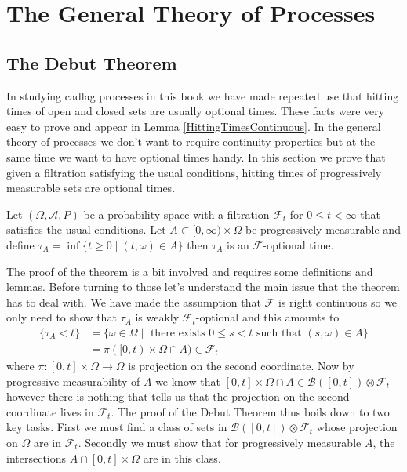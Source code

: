 \chapter{The General Theory of Processes}

\section{The Debut Theorem}

In studying cadlag processes in this book we have made repeated use that hitting times of open and closed sets are usually optional times.  These facts were very easy to prove
and appear in Lemma \ref{HittingTimesContinuous}.   In the general theory of processes we don't want to require continuity properties but at the same time we want to have
optional times handy.  In this section we prove that given a filtration satisfying the usual conditions, hitting times of progressively measurable sets are optional times.  

\begin{thm}\label{DebutTheorem}Let $(\Omega, \mathcal{A}, P)$ be a probability space with a filtration $\mathcal{F}_t$ for $0 \leq t < \infty$ that satisfies the usual conditions.  Let $A \subset [0, \infty) \times \Omega$ be progressively measurable and define $\tau_A = \inf \lbrace t \geq 0 \mid (t, \omega) \in A \rbrace$ then $\tau_A$ is an $\mathcal{F}$-optional time.
\end{thm}

The proof of the theorem is a bit involved and requires some definitions and lemmas.  Before turning to those let's understand the main issue that the theorem has to deal with.  We have made the assumption that $\mathcal{F}$ is right continuous so we only need to show that $\tau_A$ is weakly $\mathcal{F}_t$-optional and this amounts to
\begin{align*}
\lbrace \tau_A < t \rbrace &= \lbrace \omega \in \Omega \mid \text{ there exists } 0 \leq s < t \text{ such that } (s, \omega) \in A \rbrace \\
&=\pi([0,t) \times \Omega \cap A) \in \mathcal{F}_t
\end{align*}
where $\pi : [0,t] \times \Omega \to \Omega$ is projection on the second coordinate.  Now by progressive measurability of $A$ we know that $[0,t] \times \Omega \cap A \in \mathcal{B}([0,t]) \otimes \mathcal{F}_t$ however there is nothing that tells us that the projection on the second coordinate lives in $\mathcal{F}_t$.  The proof of the Debut Theorem thus boils down to two key tasks.  First we must find a class of sets in $\mathcal{B}([0,t]) \otimes \mathcal{F}_t$ whose projection on $\Omega$ are in $\mathcal{F}_t$.  Secondly we must show that for progressively measurable $A$, the intersections $A \cap [0,t] \times \Omega$ are in this class.

